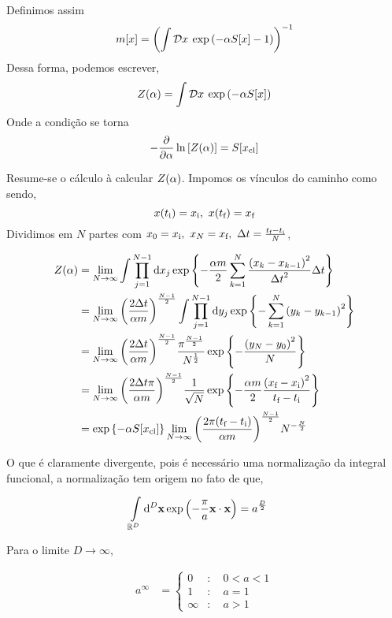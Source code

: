 \documentclass[twoside]{amsart}
\newcommand{\Dd}[1]{\mathcal D #1\: }
\numberwithin{equation}{section}
\begin{document}
Definimos assim $$m\qty[x]=\qty(\int\Dd x\exp\qty(-\alpha S\qty[x]-1))^{-1}$$ Dessa forma, podemos escrever,
$$Z\qty(\alpha)=\int\Dd x\exp\qty(-\alpha S\qty[x])$$ Onde a condição se torna
$$-\pdv{}{\alpha}\ln\qty[Z\qty(\alpha)]=S\qty[x_\textnormal{cl}]$$

Resume-se o cálculo à calcular $Z\qty(\alpha)$. Impomos os vínculos do caminho como sendo, $$x\qty(t_{\textnormal i})=x_{\textnormal i},\ x\qty(t_{\textnormal f})=x_{\textnormal f}$$
Dividimos em $N$ partes com $x_0=x_{\textnormal i},\ x_N=x_{\textnormal f},\ \Delta t=\frac{t_{\textnormal f}-t_{\textnormal i}}{N}$,

\begin{align*}
    Z\qty(\alpha)&=\lim\limits_{N\rightarrow \infty}\int\prod\limits_{j=1}^{N-1}\dd{x_j}\exp\qty{-\frac{\alpha m}{2}\sum\limits_{k=1}^N\frac{\qty(x_k-x_{k-1})^2}{{\Delta t}^2}\Delta t}\\
    &=\lim\limits_{N\rightarrow \infty}\qty(\frac{2\Delta t}{\alpha m})^{\frac{N-1}{2}}\int\prod\limits_{j=1}^{N-1}\dd{y_j}\exp\qty{-\sum\limits_{k=1}^N\qty(y_{k}-y_{k-1})^2}\\
    &=\lim\limits_{N\rightarrow \infty}\qty(\frac{2\Delta t}{\alpha m})^{\frac{N-1}{2}}\frac{\pi^{\frac{N-1}{2}}}{N^{\frac12}}\exp\qty{-\frac{\qty(y_N-y_0)^2}{N}}\\
    &=\lim\limits_{N\rightarrow \infty}\qty(\frac{2\Delta t\pi}{\alpha m})^{\frac{N-1}{2}}\frac{1}{\sqrt{N}}\exp\qty{-\frac{\alpha m}{2}\frac{\qty(x_{\textnormal f}-x_{\textnormal i})^2}{t_{\textnormal f}-t_{\textnormal i}}}\\
    &=\exp\qty{-\alpha S\qty[x_{\textnormal{cl}}]}\lim\limits_{N\rightarrow \infty}\qty(\frac{2\pi\qty(t_{\textnormal f}-t_{\textnormal i})}{\alpha m})^{\frac{N-1}{2}}N^{-\frac N2}
\end{align*}

O que é claramente divergente, pois é necessário uma normalização da integral funcional, a normalização tem 
origem no fato de que,

\begin{align*}
    \int\limits_{{\mathbb R}^D}\dd[D]{\vb x}\exp\qty(- \frac\pi a\vb x\cdot\vb x)&=a^{\frac D2}
\end{align*}

Para o limite $D\rightarrow\infty$,

\begin{align*}
    a^\infty&=\begin{cases}
        0&:\quad0<a<1\\
        1&:\quad a=1\\
        \infty&:\quad a>1
    \end{cases}
\end{align*}
\end{document}
